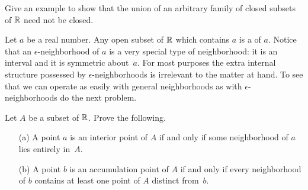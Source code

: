 \begin{prob} Give an example to show that the union of an arbitrary family of closed subsets
of $\mathbb{R}$ need not be closed.
\end{prob}

\begin{defn} Let $a$ be a real number.  Any open subset of $\mathbb{R}$ which contains $a$ is a
 of $a$.  Notice that an $\epsilon$-neighborhood of $a$ is a very special
type of neighborhood: it is an interval and it is symmetric about~$a$.  For most purposes the
extra internal structure possessed by $\epsilon$-neighborhoods is irrelevant to the matter at
hand.  To see that we can operate as easily with general neighborhoods as with
$\epsilon$-neighborhoods do the next problem.
\end{defn}

\begin{prob} Let $A$ be a subset of $\mathbb{R}$.  Prove the following.
 \begin{enumerate}
  \item[(a)] A point $a$ is an interior point of $A$ if and only if some
neighborhood of $a$ lies entirely in~$A$.
  \item[(b)] A point $b$ is an accumulation point of $A$ if and only if every
neighborhood of $b$ contains at least one point of $A$ distinct
from~$b$.
 \end{enumerate}
\end{prob}

\endinput
